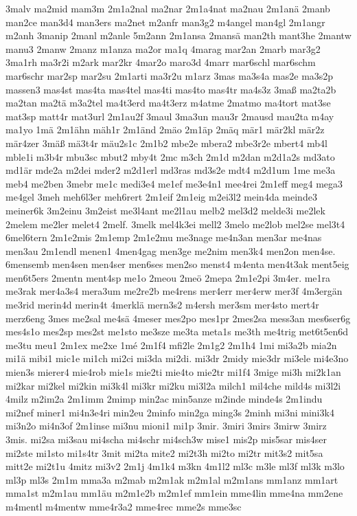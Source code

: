 {3malv
ma2mid
mam3m
2m1a2nal
ma2nar
2m1a4nat
ma2nau
2m1anä
2manb
man2ce
man3d4
man3ers
ma2net
m2anfr
man3g2
m4angel
man4gl
2m1angr
m2anh
3manip
2manl
m2anle
5m2ann
2m1ansa
2mansä
man2th
mant3he
2mantw
manu3
2manw
2manz
m1anza
ma2or
ma1q
4marag
mar2an
2marb
mar3g2
3ma1rh
ma3r2i
m2ark
mar2kr
4mar2o
maro3d
4marr
mar6schl
mar6schm
mar6schr
mar2sp
mar2su
2m1arti
ma3r2u
m1arz
3mas
ma3s4a
mas2e
ma3s2p
massen3
mas4st
mas4ta
mas4tel
mas4ti
mas4to
mas4tr
ma4s3z
3maß
ma2ta2b
ma2tan
ma2tä
m3a2tel
ma4t3erd
ma4t3erz
m4atme
2matmo
ma4tort
mat3se
mat3sp
matt4r
mat3url
2m1au2f
3maul
3ma3un
mau3r
2mausd
mau2ta
m4ay
ma1yo
1mä
2m1ähn
mäh1r
2m1änd
2mäo
2m1äp
2mäq
mär1
mär2kl
mär2z
mär4zer
3mäß
mä3t4r
mäu2s1c
2m1b2
mbe2e
mbera2
mbe3r2e
mbert4
mb4l
mble1i
m3b4r
mbu3sc
mbut2
mby4t
2mc
m3ch
2m1d
m2dan
m2d1a2s
md3ato
md1är
mde2a
m2dei
mder2
m2d1erl
md3ras
md3s2e
mdt4
m2d1um
1me
me3a
meb4
me2ben
3mebr
me1c
medi3e4
me1ef
me3e4n1
mee4rei
2m1eff
meg4
mega3
me4gel
3meh
meh6l3er
meh6rert
2m1eif
2m1eig
m2ei3l2
mein4da
meinde3
meiner6k
3m2einu
3m2eist
me3l4ant
me2l1au
melb2
mel3d2
melde3i
me2lek
2melem
me2ler
melet4
2melf.
3melk
mel4k3ei
mell2
3melo
me2lob
mel2se
mel3t4
6mel6tern
2m1e2mis
2m1emp
2m1e2mu
me3nage
me4n3an
men3ar
me4nas
men3au
2m1endl
menen1
4men4gag
men3ge
me2nim
men3k4
men2on
men4se.
6mensemb
men4sen
men4ser
men6ses
men2so
menst4
m4enta
men4t3ak
ment5eig
men6t5ers
2mentn
ment4sp
me1o
2meou
2meö
2mepa
2m1e2pi
3m4er.
me1ra
me3rak
mer4a3s4
mera3um
me2re2b
me4rens
mer4err
mer4erw
mer3f
4m3ergän
me3rid
merin4d
merin4t
4merklä
mern3s2
m4ersh
mer3sm
mer4sto
mert4r
merz6eng
3mes
me2sal
me4sä
4meser
mes2po
mes1pr
2mes2sa
mess3an
mes6ser6g
mes4s1o
mes2sp
mes2st
me1sto
me3sze
me3ta
meta1s
me3th
me4trig
met6t5en6d
me3tu
meu1
2m1ex
me2xe
1mé
2m1f4
mfi2le
2m1g2
2m1h4
1mi
mi3a2b
mia2n
mi1ä
mibi1
mic1e
mi1ch
mi2ci
mi3da
mi2di.
mi3dr
2midy
mie3dr
mi3ele
mi4e3no
mien3s
mierer4
mie4rob
mie1s
mie2ti
mie4to
mie2tr
mi1f4
3mige
mi3h
mi2k1an
mi2kar
mi2kel
mi2kin
mi3k4l
mi3kr
mi2ku
mi3l2a
milch1
mil4che
mild4s
mi3l2i
4milz
m2im2a
2m1imm
2mimp
min2ac
min5anze
m2inde
minde4s
2m1indu
mi2nef
miner1
mi4n3e4ri
min2eu
2minfo
min2ga
ming3s
2minh
mi3ni
mini3k4
mi3n2o
mi4n3of
2m1inse
mi3nu
mioni1
mi1p
3mir.
3miri
3mirs
3mirw
3mirz
3mis.
mi2sa
mi3sau
mi4scha
mi4schr
mi4sch3w
mise1
mis2p
mis5sar
mis4ser
mi2ste
mi1sto
mi1s4tr
3mit
mi2ta
mite2
mi2t3h
mi2to
mi2tr
mit3s2
mit5sa
mitt2e
mi2t1u
4mitz
mi3v2
2m1j
4m1k4
m3kn
4m1l2
ml3c
m3le
ml3f
ml3k
m3lo
ml3p
ml3s
2m1m
mma3a
m2mab
m2m1ak
m2m1al
m2m1ans
mm1anz
mm1art
mma1st
m2m1au
mm1äu
m2m1e2b
m2m1ef
mm1ein
mme4lin
mme4na
mm2ene
m4mentl
m4mentw
mme4r3a2
mme4rec
mme2s
mme3sc
}
